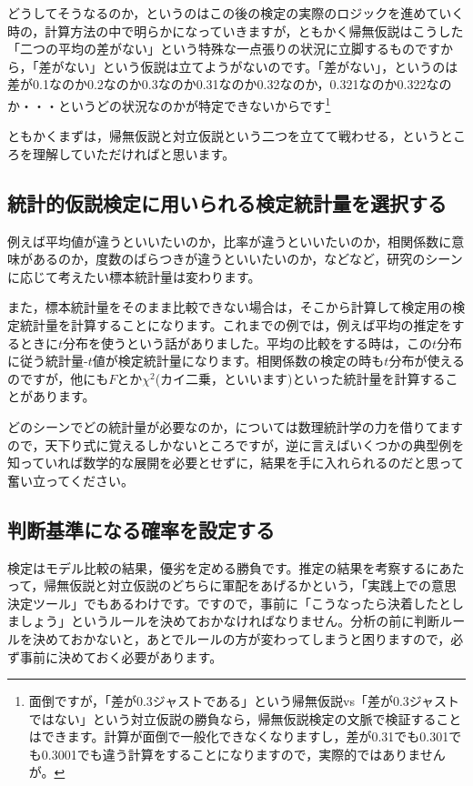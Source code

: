 \documentclass{ltjsbook}
\begin{document}
どうしてそうなるのか，というのはこの後の検定の実際のロジックを進めていく時の，計算方法の中で明らかになっていきますが，ともかく帰無仮説はこうした「二つの平均の差がない」という特殊な一点張りの状況に立脚するものですから，「差がない」という仮説は立てようがないのです。「差がない」，というのは差が0.1なのか0.2なのか0.3なのか0.31なのか0.32なのか，0.321なのか0.322なのか・・・というどの状況なのかが特定できないからです\footnote{面倒ですが，「差が0.3ジャストである」という帰無仮説vs「差が0.3ジャストではない」という対立仮説の勝負なら，帰無仮説検定の文脈で検証することはできます。計算が面倒で一般化できなくなりますし，差が0.31でも0.301でも0.3001でも違う計算をすることになりますので，実際的ではありませんが。}

ともかくまずは，帰無仮説と対立仮説という二つを立てて戦わせる，というところを理解していただければと思います。

\subsection{統計的仮説検定に用いられる検定統計量を選択する}
例えば平均値が違うといいたいのか，比率が違うといいたいのか，相関係数に意味があるのか，度数のばらつきが違うといいたいのか，などなど，研究のシーンに応じて考えたい標本統計量は変わります。

また，標本統計量をそのまま比較できない場合は，そこから計算して検定用の検定統計量を計算することになります。これまでの例では，例えば平均の推定をするときに$t$分布を使うという話がありました。平均の比較をする時は，この$t$分布に従う統計量-$t$値が検定統計量になります。相関係数の検定の時も$t$分布が使えるのですが，他にも$F$とか$\chi^2$(カイ二乗，といいます)といった統計量を計算することがあります。

どのシーンでどの統計量が必要なのか，については数理統計学の力を借りてますので，天下り式に覚えるしかないところですが，逆に言えばいくつかの典型例を知っていれば数学的な展開を必要とせずに，結果を手に入れられるのだと思って奮い立ってください。

\subsection{判断基準になる確率を設定する}
検定はモデル比較の結果，優劣を定める勝負です。推定の結果を考察するにあたって，帰無仮説と対立仮説のどちらに軍配をあげるかという，「実践上での意思決定ツール」でもあるわけです。ですので，事前に「こうなったら決着したとしましょう」というルールを決めておかなければなりません。分析の前に判断ルールを決めておかないと，あとでルールの方が変わってしまうと困りますので，必ず事前に決めておく必要があります。
\end{document}
